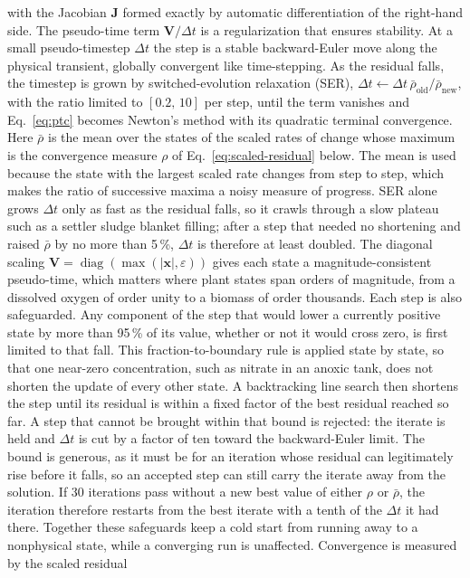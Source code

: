 \documentclass{article}
\begin{document}
with the Jacobian \(\mathbf{J}\) formed exactly by automatic differentiation of the right-hand side. The pseudo-time term \(\mathbf{V}/\Delta t\) is a regularization that ensures stability.  At a small pseudo-timestep \(\Delta t\) the step is a stable backward-Euler move along the physical transient, globally convergent like time-stepping. As the residual falls, the timestep is grown by switched-evolution relaxation (SER), \(\Delta t \leftarrow \Delta t\,\bar\rho_{\mathrm{old}}/\bar\rho_{\mathrm{new}}\), with the ratio limited to \([0.2,\,10]\) per step, until the term vanishes and Eq.~\eqref{eq:ptc} becomes Newton's method with its quadratic terminal convergence. Here \(\bar\rho\) is the mean over the states of the scaled rates of change whose maximum is the convergence measure \(\rho\) of Eq.~\eqref{eq:scaled-residual} below. The mean is used because the state with the largest scaled rate changes from step to step, which makes the ratio of successive maxima a noisy measure of progress. SER alone grows \(\Delta t\) only as fast as the residual falls, so it crawls through a slow plateau such as a settler sludge blanket filling; after a step that needed no shortening and raised \(\bar\rho\) by no more than 5\,\%, \(\Delta t\) is therefore at least doubled. The diagonal scaling \(\mathbf{V}=\operatorname{diag}(\max(\lvert\mathbf{x}\rvert,\varepsilon))\) gives each state a magnitude-consistent pseudo-time, which matters where plant states span orders of magnitude, from a dissolved oxygen of order unity to a biomass of order thousands. Each step is also safeguarded. Any component of the step that would lower a currently positive state by more than 95\,\% of its value, whether or not it would cross zero, is first limited to that fall. This fraction-to-boundary rule is applied state by state, so that one near-zero concentration, such as nitrate in an anoxic tank, does not shorten the update of every other state. A backtracking line search then shortens the step until its residual is within a fixed factor of the best residual reached so far. A step that cannot be brought within that bound is rejected: the iterate is held and \(\Delta t\) is cut by a factor of ten toward the backward-Euler limit. The bound is generous, as it must be for an iteration whose residual can legitimately rise before it falls, so an accepted step can still carry the iterate away from the solution. If 30 iterations pass without a new best value of either \(\rho\) or \(\bar\rho\), the iteration therefore restarts from the best iterate with a tenth of the \(\Delta t\) it had there. Together these safeguards keep a cold start from running away to a nonphysical state, while a converging run is unaffected. Convergence is measured by the scaled residual
\end{document}
